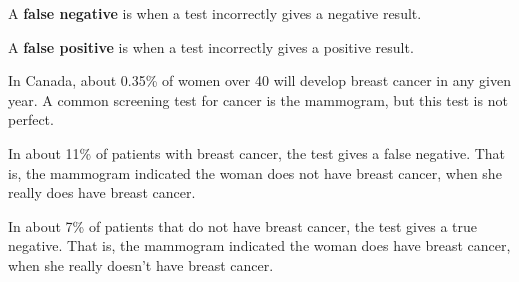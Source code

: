 \documentclass{beamer}
\begin{document}
\begin{frame}
\begin{definition}
A \textbf{false negative} is when a test incorrectly gives a negative result.
\end{definition}\pause

\begin{definition}
A \textbf{false positive} is when a test incorrectly gives a positive result.
\end{definition}\pause

\begin{example}
In Canada, about 0.35\% of women over 40 will develop breast cancer in any given year. A common screening test for cancer is the mammogram, but this test is not perfect.\pause

\vspace{2mm}
In about 11\% of patients with breast cancer, the test gives a false negative. That is, the mammogram indicated the woman does not have breast cancer, when she really does have breast cancer.\pause

\vspace{2mm}
In about 7\% of patients that do not have breast cancer, the test gives a true negative. That is, the mammogram indicated the woman does have breast cancer, when she really doesn't have breast cancer.
\end{example}
\end{frame}
\end{document}
